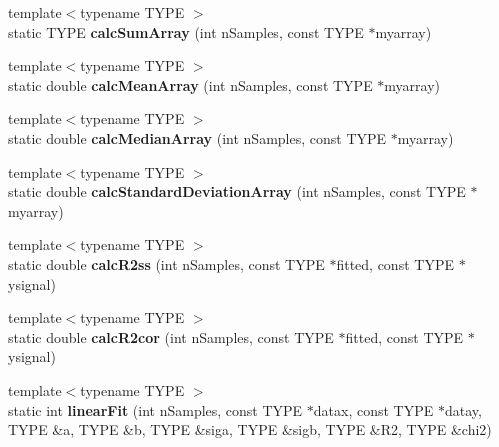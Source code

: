 \begin{DoxyCompactItemize}
\item 
{\footnotesize template$<$typename T\+Y\+PE $>$ }\\static T\+Y\+PE {\bfseries calc\+Sum\+Array} (int n\+Samples, const T\+Y\+PE $\ast$myarray)\hypertarget{class_k_w_util_abe27306f912197863466e7c68d3c66fb}{}\label{class_k_w_util_abe27306f912197863466e7c68d3c66fb}

\item 
{\footnotesize template$<$typename T\+Y\+PE $>$ }\\static double {\bfseries calc\+Mean\+Array} (int n\+Samples, const T\+Y\+PE $\ast$myarray)\hypertarget{class_k_w_util_ad9cb19db7d541d5ca5a60c6a28b922e1}{}\label{class_k_w_util_ad9cb19db7d541d5ca5a60c6a28b922e1}

\item 
{\footnotesize template$<$typename T\+Y\+PE $>$ }\\static double {\bfseries calc\+Median\+Array} (int n\+Samples, const T\+Y\+PE $\ast$myarray)\hypertarget{class_k_w_util_a6c10285ae2d87ccda6ddaa18c81dea39}{}\label{class_k_w_util_a6c10285ae2d87ccda6ddaa18c81dea39}

\item 
{\footnotesize template$<$typename T\+Y\+PE $>$ }\\static double {\bfseries calc\+Standard\+Deviation\+Array} (int n\+Samples, const T\+Y\+PE $\ast$myarray)\hypertarget{class_k_w_util_ad9d38c641f6b227be4418acf404170d4}{}\label{class_k_w_util_ad9d38c641f6b227be4418acf404170d4}

\item 
{\footnotesize template$<$typename T\+Y\+PE $>$ }\\static double {\bfseries calc\+R2ss} (int n\+Samples, const T\+Y\+PE $\ast$fitted, const T\+Y\+PE $\ast$ysignal)\hypertarget{class_k_w_util_ae26dd38b1c5c823fa37129520bb4cc47}{}\label{class_k_w_util_ae26dd38b1c5c823fa37129520bb4cc47}

\item 
{\footnotesize template$<$typename T\+Y\+PE $>$ }\\static double {\bfseries calc\+R2cor} (int n\+Samples, const T\+Y\+PE $\ast$fitted, const T\+Y\+PE $\ast$ysignal)\hypertarget{class_k_w_util_a9eecfdafa3ae5e493830181fa7ea8fa3}{}\label{class_k_w_util_a9eecfdafa3ae5e493830181fa7ea8fa3}

\item 
{\footnotesize template$<$typename T\+Y\+PE $>$ }\\static int {\bfseries linear\+Fit} (int n\+Samples, const T\+Y\+PE $\ast$datax, const T\+Y\+PE $\ast$datay, T\+Y\+PE \&a, T\+Y\+PE \&b, T\+Y\+PE \&siga, T\+Y\+PE \&sigb, T\+Y\+PE \&R2, T\+Y\+PE \&chi2)\hypertarget{class_k_w_util_a511fe664e5e86d1ce7676ea3bfb4cc92}{}\label{class_k_w_util_a511fe664e5e86d1ce7676ea3bfb4cc92}


\end{DoxyCompactItemize}
